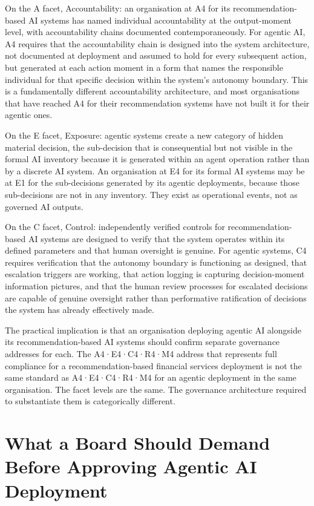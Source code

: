 On the A facet, Accountability: an organisation at A4 for its recommendation-based AI systems has named individual accountability at the output-moment level, with accountability chains documented contemporaneously. For agentic AI, A4 requires that the accountability chain is designed into the system architecture, not documented at deployment and assumed to hold for every subsequent action, but generated at each action moment in a form that names the responsible individual for that specific decision within the system's autonomy boundary. This is a fundamentally different accountability architecture, and most organisations that have reached A4 for their recommendation systems have not built it for their agentic ones.

On the E facet, Exposure: agentic systems create a new category of hidden material decision, the sub-decision that is consequential but not visible in the formal AI inventory because it is generated within an agent operation rather than by a discrete AI system. An organisation at E4 for its formal AI systems may be at E1 for the sub-decisions generated by its agentic deployments, because those sub-decisions are not in any inventory. They exist as operational events, not as governed AI outputs.

On the C facet, Control: independently verified controls for recommendation-based AI systems are designed to verify that the system operates within its defined parameters and that human oversight is genuine. For agentic systems, C4 requires verification that the autonomy boundary is functioning as designed, that escalation triggers are working, that action logging is capturing decision-moment information pictures, and that the human review processes for escalated decisions are capable of genuine oversight rather than performative ratification of decisions the system has already effectively made.

The practical implication is that an organisation deploying agentic AI alongside its recommendation-based AI systems should confirm separate governance addresses for each. The A4·E4·C4·R4·M4 address that represents full compliance for a recommendation-based financial services deployment is not the same standard as A4·E4·C4·R4·M4 for an agentic deployment in the same organisation. The facet levels are the same. The governance architecture required to substantiate them is categorically different.

\scenebreak

\section{What a Board Should Demand Before Approving Agentic AI Deployment}


